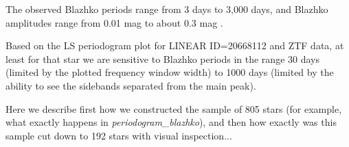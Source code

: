 The observed Blazhko periods range from 3 days to 3,000 days, and Blazhko amplitudes range from 0.01 mag to about 0.3 mag \citep{2007MNRAS.377.1263S}.


%

Based on the LS periodogram plot for LINEAR ID=20668112 and ZTF data, at least for that star we are
sensitive to Blazhko periods in the range 30 days (limited by the plotted frequency window width) to
1000 days (limited by the ability to see the sidebands separated from the main peak). 


Here we describe first how we constructed the sample of 805 stars (for example, what exactly happens in
{\it periodogram\_blazhko}), and then how exactly was this sample cut down to 192 stars with visual inspection... 
